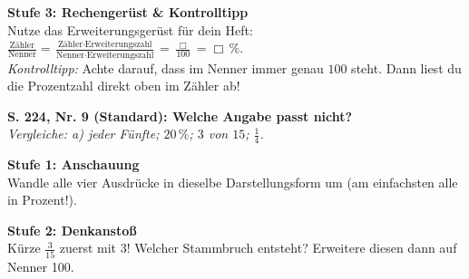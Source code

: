 \documentclass[a4paper,10pt]{article}
\begin{document}
\begin{tcolorbox}[colback=step3Bg, colframe=step3Border, arc=1.8mm, boxrule=0.7pt, left=3mm, right=3mm, top=1.8mm, bottom=1.8mm]
    {\color{step3Text}\small\bfseries\faTh\enskip Stufe 3: Rechengerüst \& Kontrolltipp}\\[1mm]
    {\footnotesize
    Nutze das Erweiterungsgerüst für dein Heft:\\
    $\frac{\text{Zähler}}{\text{Nenner}} = \frac{\text{Zähler} \cdot \text{Erweiterungszahl}}{\text{Nenner} \cdot \text{Erweiterungszahl}} = \frac{\Box}{100} = \Box\,\%$.\\[1mm]
    \textit{Kontrolltipp:} Achte darauf, dass im Nenner immer genau $100$ steht. Dann liest du die Prozentzahl direkt oben im Zähler ab!}
\end{tcolorbox}

\vspace{3.5mm}

\begin{tcolorbox}[enhanced, colback=lvlBlue!5, colframe=lvlBlue!50, arc=2mm, boxrule=0.8pt, left=3mm, right=3mm, top=2mm, bottom=2mm]
    {\bfseries\color{lvlBlue} \faStar\faStar\enskip S. 224, Nr. 9 (Standard): Welche Angabe passt nicht?}\\[1mm]
    {\footnotesize\textit{Vergleiche: a) jeder Fünfte; $20\,\%$; $3$ von $15$; $\frac{1}{4}$.}}
\end{tcolorbox}

\vspace{1.5mm}

\begin{tcolorbox}[colback=step1Bg, colframe=step1Border, arc=1.8mm, boxrule=0.7pt, left=3mm, right=3mm, top=1.8mm, bottom=1.8mm]
    {\color{step1Text}\small\bfseries\faEye\enskip Stufe 1: Anschauung}\\[1mm]
    {\footnotesize Wandle alle vier Ausdrücke in dieselbe Darstellungsform um (am einfachsten alle in Prozent!).}
\end{tcolorbox}

\begin{tcolorbox}[colback=step2Bg, colframe=step2Border, arc=1.8mm, boxrule=0.7pt, left=3mm, right=3mm, top=1.8mm, bottom=1.8mm]
    {\color{step2Text}\small\bfseries\faLightbulb\enskip Stufe 2: Denkanstoß}\\[1mm]
    {\footnotesize Kürze $\frac{3}{15}$ zuerst mit 3! Welcher Stammbruch entsteht? Erweitere diesen dann auf Nenner 100.}
\end{tcolorbox}
\end{document}
